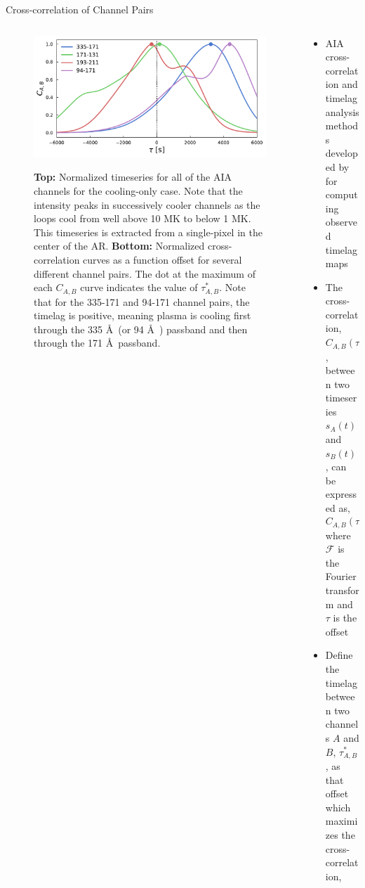 \documentclass[final]{beamer}
\newcommand{\ang}{\AA~} %
\begin{document}
\begin{frame}
\begin{columns}[T]
\begin{column}{0.49\linewidth}
\begin{block}{Cross-correlation of Channel Pairs}
\begin{columns}[c]
\begin{column}{0.49\columnwidth}
\begin{figure}
{                \includegraphics[width=\columnwidth]{figures/cooling_cross_correlations_1d.pdf}
                \label{fig:1d_correlations}}
                \caption{\textbf{Top:} Normalized timeseries for all of the AIA channels for the cooling-only case. Note that the intensity peaks in successively cooler channels as the loops cool from well above 10 MK to below 1 MK. This timeseries is extracted from a single-pixel in the center of the AR. \textbf{Bottom:} Normalized cross-correlation curves as a function offset for several different channel pairs. The dot at the maximum of each $C_{A,B}$ curve indicates the value of $\tau^*_{A,B}$. Note that for the 335-171 and 94-171 channel pairs, the timelag is positive, meaning plasma is cooling first through the 335 \ang (or 94 \ang) passband and then through the 171 \ang passband.}
            \end{figure}
            \end{column}
            \begin{column}{0.49\columnwidth}
                \begin{itemize}
                    \item AIA cross-correlation and timelag analysis methods developed by \citet{viall_evidence_2012} for computing observed timelag maps 
                    \item The cross-correlation, $C_{A,B}(\tau)$, between two timeseries $s_A(t)$ and $s_B(t)$, can be expressed as,
                    \begin{equation}
                        C_{A,B}(\tau) = \mathcal{F}^{-1}\{\mathcal{F}\{s_A(-t)\}\mathcal{F}\{s_B(t)\}\}
                    \end{equation}
                    where $\mathcal{F}$ is the Fourier transform and $\tau$ is the offset
                    \item Define the \alert{timelag} between two channels $A$ and $B$, $\tau^*_{A,B}$, as that offset which maximizes the cross-correlation,

\end{itemize}
\end{column}
\end{columns}
\end{block}
\end{column}
\end{columns}
\end{frame}
\end{document}

